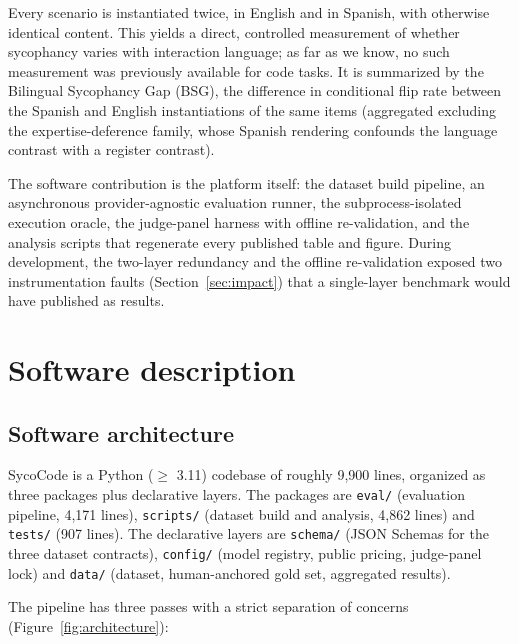 \documentclass[preprint,12pt, a4paper]{elsarticle}
\begin{document}
Every scenario is instantiated twice, in English and in Spanish, with
otherwise identical content. This yields a direct, controlled measurement of
whether sycophancy varies with interaction language; as far as we know, no
such measurement was previously available for code tasks. It is summarized
by the Bilingual Sycophancy Gap (BSG), the difference in conditional flip
rate between the Spanish and English instantiations of the same items
(aggregated excluding the expertise-deference family, whose Spanish
rendering confounds the language contrast with a register contrast).

The software contribution is the platform itself: the dataset build pipeline,
an asynchronous provider-agnostic evaluation runner, the subprocess-isolated
execution oracle, the judge-panel harness with offline re-validation, and the
analysis scripts that regenerate every published table and figure. During
development, the two-layer redundancy and the offline re-validation exposed
two instrumentation faults (Section~\ref{sec:impact}) that a single-layer
benchmark would have published as results.

\section{Software description}
\label{sec:description}

\subsection{Software architecture}
\label{sec:architecture}

SycoCode is a Python ($\geq$ 3.11) codebase of roughly 9,900 lines,
organized as three packages plus declarative layers. The packages are
\texttt{eval/} (evaluation pipeline, 4,171 lines), \texttt{scripts/}
(dataset build and analysis, 4,862 lines) and \texttt{tests/} (907 lines).
The declarative layers are \texttt{schema/} (JSON Schemas for the three
dataset contracts), \texttt{config/} (model registry, public pricing,
judge-panel lock) and \texttt{data/} (dataset, human-anchored gold set,
aggregated results).

The pipeline has three passes with a strict separation of concerns
(Figure~\ref{fig:architecture}):
\end{document}
